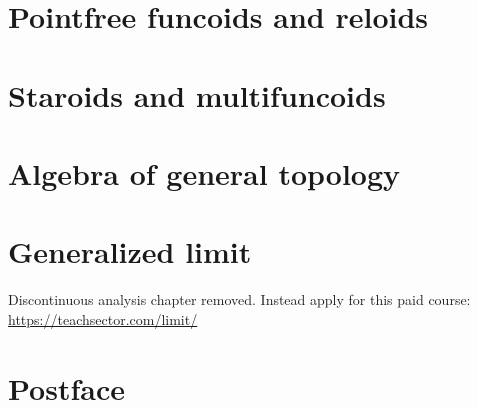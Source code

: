 \documentclass[a4paper,oneside,english,reqno]{amsbook}
\numberwithin{section}{chapter}
\begin{document}
\part{Pointfree funcoids and reloids}



\part{Staroids and multifuncoids}



\part{Algebra of general topology}



\part{Generalized limit}
Discontinuous analysis chapter removed.
Instead apply for this paid course:
\url{https://teachsector.com/limit/}

% 

\part{Postface}






\printindex{}




\addtocounter{figure}{-1}
\label{LASTFIGURE}
\end{document}
